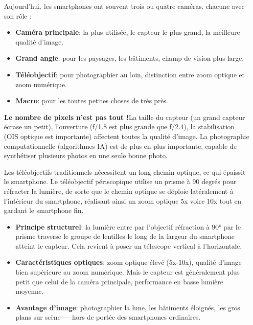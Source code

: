 Aujourd'hui, les smartphones ont souvent trois ou quatre caméras, chacune avec son rôle :

\begin{itemize}
  \item \textbf{Caméra principale}: la plus utilisée, le capteur le plus grand, la meilleure qualité d'image.
  \item \textbf{Grand angle}: pour les paysages, les bâtiments, champ de vision plus large.
  \item \textbf{Téléobjectif}: pour photographier au loin, distinction entre zoom optique et zoom numérique.
  \item \textbf{Macro}: pour les toutes petites choses de très près.
\end{itemize}

\textbf{Le nombre de pixels n'est pas tout !}La taille du capteur (un grand capteur écrase un petit), l'ouverture (f/1.8 est plus grande que f/2.4), la stabilisation (OIS optique est importante) affectent toutes la qualité d'image. La photographie computationnelle (algorithmes IA) est de plus en plus importante, capable de synthétiser plusieurs photos en une seule bonne photo.


Les téléobjectifs traditionnels nécessitent un long chemin optique, ce qui épaissit le smartphone. Le téléobjectif périscopique utilise un prisme à 90 degrés pour réfracter la lumière, de sorte que le chemin optique se déploie latéralement à l'intérieur du smartphone, réalisant ainsi un zoom optique 5x voire 10x tout en gardant le smartphone fin.

\begin{itemize}
  \item \textbf{Principe structurel}: la lumière entre par l'objectif réfraction à 90° par le prisme traverse le groupe de lentilles le long de la largeur du smartphone atteint le capteur. Cela revient à poser un télescope vertical à l'horizontale.
  \item \textbf{Caractéristiques optiques}: zoom optique élevé (5x-10x), qualité d'image bien supérieure au zoom numérique. Mais le capteur est généralement plus petit que celui de la caméra principale, performance en basse lumière moyenne.
  \item \textbf{Avantage d'image}: photographier la lune, les bâtiments éloignés, les gros plans sur scène — hors de portée des smartphones ordinaires.
\end{itemize}

